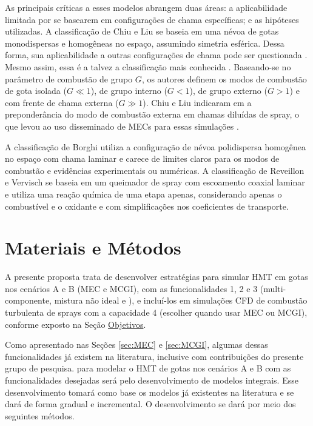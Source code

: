 As principais críticas a esses modelos abrangem duas áreas: a aplicabilidade limitada por se basearem em configurações de chama específicas; e as hipóteses utilizadas. 
A classificação de Chiu e Liu \cite{ChiuH1977,ChiuH1982} se baseia em uma névoa de gotas monodispersas e homogêneas no espaço, assumindo simetria esférica.
Dessa forma, sua aplicabilidade a outras configurações de chama pode ser questionada \cite{SacomanoF2017PhD}.
Mesmo assim, essa é a talvez a classificação mais conhecida \cite{JennyB2012}.
Baseando-se no parâmetro de combustão de grupo $G$, os autores definem  os modos de combustão de gota isolada ($G\ll1$), de grupo interno ($G<1$), de grupo externo ($G>1$) e com frente de chama externa ($G\gg1$).
Chiu e Liu indicaram em \cite{ChiuH1982} a preponderância do modo de combustão externa em chamas diluídas de spray, o que levou ao uso disseminado de MECs para essas simulações \cite{SacomanoF2017PhD}.

A classificação de Borghi \cite{Borghi1996} utiliza a configuração de névoa polidispersa homogênea no espaço com chama laminar e carece de limites claros para os modos de combustão e evidências experimentais ou numéricas.
A classificação de Reveillon e Vervisch  \cite{ReveillonJ2005} se baseia em um queimador de spray com escoamento coaxial laminar e utiliza uma reação química de uma etapa apenas, considerando apenas o combustível e o oxidante e com simplificações nos coeficientes de transporte.




\section{Materiais e Métodos} \label{sec:metod}

A presente proposta trata de desenvolver estratégias para simular HMT em gotas nos cenários {A} e {B} (MEC e MCGI), com as funcionalidades {1}, {2} e {3} (multi-componente, mistura não ideal e ), e incluí-los em simulações CFD de combustão turbulenta de sprays com a capacidade 4 (escolher quando usar MEC ou MCGI), conforme exposto na Seção \hyperref[sec:objetivos]{Objetivos}.

Como apresentado nas Seções \ref{sec:MEC} e \ref{sec:MCGI}, algumas dessas funcionalidades já existem na literatura, inclusive com contribuições do presente grupo de pesquisa.
 para modelar o HMT de gotas nos cenários {A} e {B} com as funcionalidades desejadas será pelo desenvolvimento de modelos integrais.
Esse desenvolvimento tomará como base os modelos já existentes na literatura e se dará de forma gradual e incremental.
O desenvolvimento se dará por meio dos seguintes métodos.

